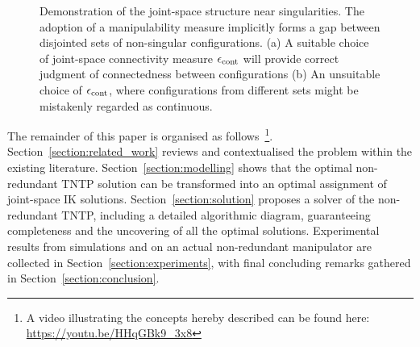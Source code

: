 \documentclass[letterpaper, 10 pt, conference]{ieeeconf}  %
\begin{document}
\begin{figure}[t]
\centering
{}
\caption{Demonstration of the joint-space structure near singularities. The adoption of a manipulability measure implicitly forms a gap between disjointed sets of non-singular configurations. (a) A suitable choice of joint-space connectivity measure $\epsilon_{\rm cont}$ will provide correct judgment of connectedness between configurations (b) An unsuitable choice of $\epsilon_{\rm cont}$, where configurations from different sets might be mistakenly regarded as continuous. }\label{fig:sing}
\vspace{-0.5cm}
\end{figure}



The remainder of this paper is organised as follows~\footnote{A video illustrating the concepts hereby described can be found here: \\\url{https://youtu.be/HHqGBk9_3x8}}.  
Section~\ref{section:related_work} reviews and contextualised the problem within the existing literature. 
Section~\ref{section:modelling} shows that the optimal non-redundant TNTP solution can be transformed into an optimal assignment of joint-space IK solutions. 
Section~\ref{section:solution} proposes a solver of the non-redundant TNTP, including a detailed algorithmic diagram, guaranteeing completeness and the uncovering of all the optimal solutions. 
Experimental results from simulations and on an actual non-redundant manipulator are collected in Section~\ref{section:experiments}, with final concluding remarks gathered in Section~\ref{section:conclusion}.  
\end{document}
